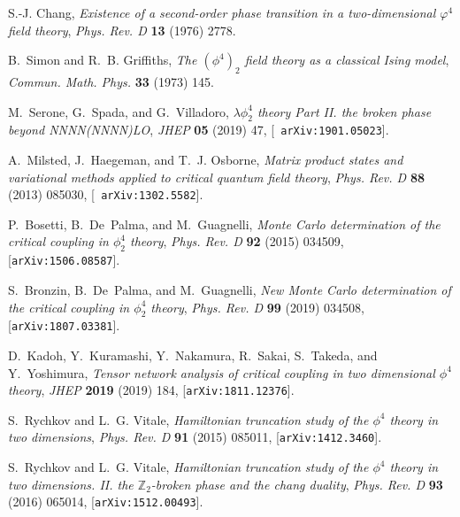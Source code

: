 \documentclass[a4paper,11pt]{article}
\begin{document}
\providecommand{\href}[2]{#2}\begingroup\raggedright\begin{thebibliography}{10}

S.-J. Chang, {\it Existence of a second-order phase transition in a
  two-dimensional ${\ensuremath{\varphi}}^{4}$ field theory},  {\em Phys. Rev.
  D} {\bf 13} (1976) 2778.

B.~Simon and R.~B. Griffiths, {\it {The $(\phi^4)_2$ field theory as a
  classical \textrm{I}sing model}},  {\em Commun. Math. Phys.} {\bf 33} (1973)
  145.

M.~Serone, G.~Spada, and G.~Villadoro, {\it {$\lambda \phi_2^4$ theory
  \textemdash{} Part II. the broken phase beyond NNNN(NNNN)LO}},  {\em JHEP}
  {\bf 05} (2019) 47, [\href{http://arxiv.org/abs/1901.05023}{{\tt
  arXiv:1901.05023}}].

A.~Milsted, J.~Haegeman, and T.~J. Osborne, {\it Matrix product states and
  variational methods applied to critical quantum field theory},  {\em Phys.
  Rev. D} {\bf 88} (2013) 085030, [\href{http://arxiv.org/abs/1302.5582}{{\tt
  arXiv:1302.5582}}].

P.~Bosetti, B.~De~Palma, and M.~Guagnelli, {\it \textrm{M}onte \textrm{C}arlo
  determination of the critical coupling in ${\ensuremath{\phi}}_{2}^{4}$
  theory},  {\em Phys. Rev. D} {\bf 92} (2015) 034509,
  [\href{http://arxiv.org/abs/1506.08587}{{\tt arXiv:1506.08587}}].

S.~Bronzin, B.~De~Palma, and M.~Guagnelli, {\it New \textrm{M}onte
  \textrm{C}arlo determination of the critical coupling in
  ${\ensuremath{\phi}}_{2}^{4}$ theory},  {\em Phys. Rev. D} {\bf 99} (2019)
  034508, [\href{http://arxiv.org/abs/1807.03381}{{\tt arXiv:1807.03381}}].

D.~Kadoh, Y.~Kuramashi, Y.~Nakamura, R.~Sakai, S.~Takeda, and Y.~Yoshimura,
  {\it Tensor network analysis of critical coupling in two dimensional $\phi^4$
  theory},  {\em JHEP} {\bf 2019} (2019) 184,
  [\href{http://arxiv.org/abs/1811.12376}{{\tt arXiv:1811.12376}}].

S.~Rychkov and L.~G. Vitale, {\it Hamiltonian truncation study of the $\phi^4$
  theory in two dimensions},  {\em Phys. Rev. D} {\bf 91} (2015) 085011,
  [\href{http://arxiv.org/abs/1412.3460}{{\tt arXiv:1412.3460}}].

S.~Rychkov and L.~G. Vitale, {\it Hamiltonian truncation study of the
  $\phi^{4}$ theory in two dimensions. \textrm{II}. the $\mathbb{Z}_{2}$-broken
  phase and the chang duality},  {\em Phys. Rev. D} {\bf 93} (2016) 065014,
  [\href{http://arxiv.org/abs/1512.00493}{{\tt arXiv:1512.00493}}].


\end{thebibliography}
\end{document}
